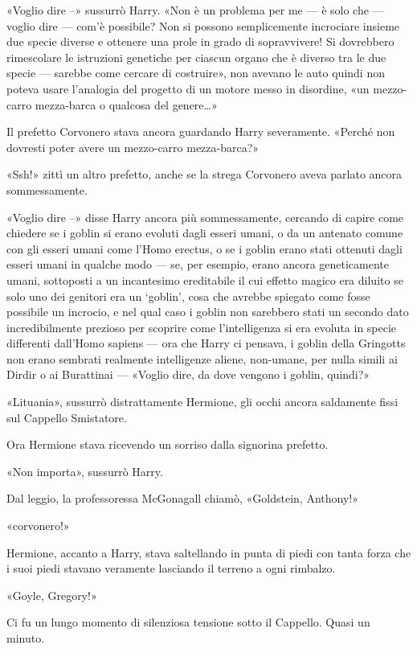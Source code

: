 «Voglio dire –» sussurrò Harry. «Non è un problema per me — è solo che — voglio dire — com’è possibile? Non si possono semplicemente incrociare insieme due specie diverse e ottenere una prole in grado di sopravvivere! Si dovrebbero rimescolare le istruzioni genetiche per ciascun organo che è diverso tra le due specie — sarebbe come cercare di costruire», non avevano le auto quindi non poteva usare l’analogia del progetto di un motore messo in disordine, «un mezzo-carro mezza-barca o qualcosa del genere…»

Il prefetto Corvonero stava ancora guardando Harry severamente. «Perché non dovresti poter avere un mezzo-carro mezza-barca?»

«Ssh!» zittì un altro prefetto, anche se la strega Corvonero aveva parlato ancora sommessamente.

«Voglio dire –» disse Harry ancora più sommessamente, cercando di capire come chiedere se i goblin si erano evoluti dagli esseri umani, o da un antenato comune con gli esseri umani come l’Homo erectus, o se i goblin erano stati ottenuti dagli esseri umani in qualche modo — se, per esempio, erano ancora geneticamente umani, sottoposti a un incantesimo ereditabile il cui effetto magico era diluito se solo uno dei genitori era un ‘goblin’, cosa che avrebbe spiegato come fosse possibile un incrocio, e nel qual caso i goblin non sarebbero stati un secondo dato incredibilmente prezioso per scoprire come l’intelligenza si era evoluta in specie differenti dall’Homo sapiens — ora che Harry ci pensava, i goblin della Gringotts non erano sembrati realmente intelligenze aliene, non-umane, per nulla simili ai Dirdir o ai Burattinai — «Voglio dire, da dove vengono i goblin, quindi?»

«Lituania», sussurrò distrattamente Hermione, gli occhi ancora saldamente fissi sul Cappello Smistatore.

Ora Hermione stava ricevendo un sorriso dalla signorina prefetto.

«Non importa», sussurrò Harry.

Dal leggio, la professoressa McGonagall chiamò, «Goldstein, Anthony!»

«corvonero!»

Hermione, accanto a Harry, stava saltellando in punta di piedi con tanta forza che i suoi piedi stavano veramente lasciando il terreno a ogni rimbalzo.

«Goyle, Gregory!»

Ci fu un lungo momento di silenziosa tensione sotto il Cappello. Quasi un minuto.

